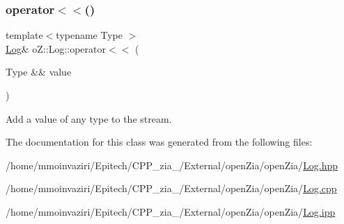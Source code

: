 \mbox{\label{classo_z_1_1_log_a0cb4c3c614b1d5ae6285aecb31554fb4}} 
\subsubsection{\texorpdfstring{operator$<$$<$()}{operator<<()}\hspace{0.1cm}{\footnotesize\ttfamily [2/2]}}
{\footnotesize\ttfamily template$<$typename Type $>$ \\
\mbox{\hyperlink{classo_z_1_1_log}{Log}}\& o\+Z\+::\+Log\+::operator$<$$<$ (\begin{DoxyParamCaption}\item[{Type \&\&}]{value }\end{DoxyParamCaption})}



Add a value of any type to the stream. 



The documentation for this class was generated from the following files\+:\begin{DoxyCompactItemize}
\item 
/home/mmoinvaziri/\+Epitech/\+C\+P\+P\+\_\+zia\+\_/\+External/open\+Zia/open\+Zia/\mbox{\hyperlink{_log_8hpp}{Log.\+hpp}}\item 
/home/mmoinvaziri/\+Epitech/\+C\+P\+P\+\_\+zia\+\_/\+External/open\+Zia/open\+Zia/\mbox{\hyperlink{_log_8cpp}{Log.\+cpp}}\item 
/home/mmoinvaziri/\+Epitech/\+C\+P\+P\+\_\+zia\+\_/\+External/open\+Zia/open\+Zia/\mbox{\hyperlink{_log_8ipp}{Log.\+ipp}}\end{DoxyCompactItemize}
